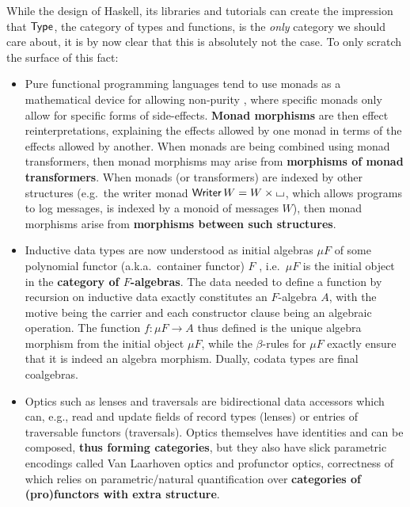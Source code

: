 \documentclass{lmcs} %
\theoremstyle{plain}\newtheorem{satz}[thm]{Satz} %
\theoremstyle{plain}
\theoremstyle{definition}
\begin{document}
While the design of Haskell, its libraries and tutorials can create the impression that ${\mathsf{Type}}$, the category of types and functions, is the \emph{only} category we should care about, it is by now clear that this is absolutely not the case.
To only scratch the surface of this fact:
\begin{itemize}
	\item Pure functional programming languages tend to use monads as a mathematical device for allowing non-purity \cite{moggi-monads}, where specific monads only allow for specific forms of side-effects.
	\textbf{Monad morphisms} are then effect reinterpretations, explaining the effects allowed by one monad in terms of the effects allowed by another.
	When monads are being combined using monad transformers, then monad morphisms may arise from \textbf{morphisms of monad transformers}.
	When monads (or transformers) are indexed by other structures (e.g.\ the writer monad ${\mathsf{Writer}}\,W = W \times {\llcorner\hspace{-.4ex}\lrcorner}$, which allows programs to log messages, is indexed by a monoid of messages $W$), then monad morphisms arise from \textbf{morphisms between such structures}.
	
	\item Inductive data types are now understood as initial algebras $\mu F$ of some polynomial functor (a.k.a.\ container functor) $F$ \cite{containers}, i.e.\ $\mu F$ is the initial object in the \textbf{category of $F$-algebras}.
	The data needed to define a function by recursion on inductive data exactly constitutes an $F$-algebra $A$, with the motive being the carrier and each constructor clause being an algebraic operation.
	The function $f : \mu F \to A$ thus defined is the unique algebra morphism from the initial object $\mu F$, while the $\beta$-rules for $\mu F$ exactly ensure that it is indeed an algebra morphism.
	Dually, codata types are final coalgebras.
	
	\item Optics such as lenses and traversals are bidirectional data accessors which can, e.g., read and update fields of record types (lenses) or entries of traversable functors (traversals).
	Optics themselves have identities and can be composed, \textbf{thus forming categories}, but they also have slick parametric encodings called Van Laarhoven optics and profunctor optics, correctness of which relies on parametric/natural quantification over \textbf{categories of (pro)functors with extra structure}.
\end{itemize}
\end{document}
